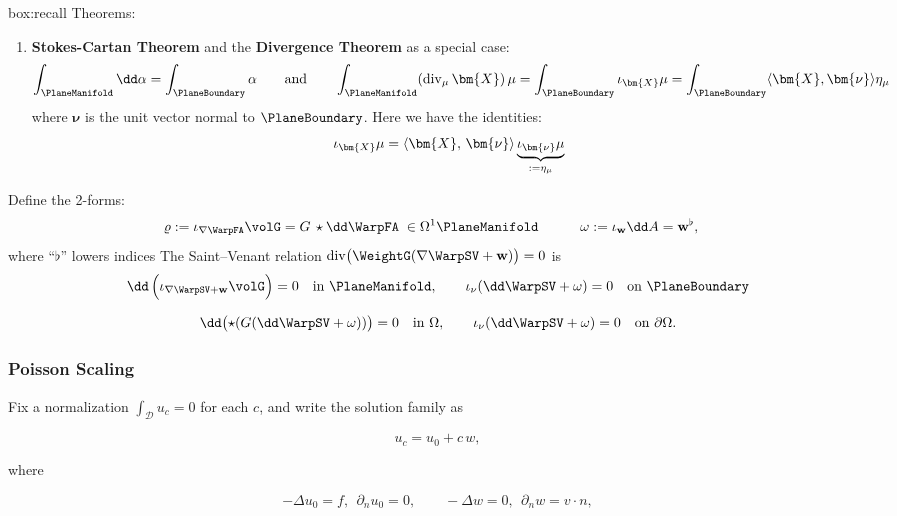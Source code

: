 \begin{ambox}{box:recall}
Theorems:
\begin{enumerate}
\item \textbf{Stokes-Cartan Theorem}
and the \textbf{Divergence Theorem} as a special case:
\begin{equation}
\int_{\PlaneManifold} \dd \alpha = \int_{\PlaneBoundary} \alpha
\qquad\text{and}\qquad
\int_{\PlaneManifold} (\operatorname{div}_{\mu} \bm{X}) \, \mu = \int_{\PlaneBoundary} \interior{\bm{X}}{\mu}
= \int_{\PlaneBoundary}\langle \bm{X}, \bm{\nu}\rangle \eta_{\mu}
\label{eq:gauss-div-thm}
\end{equation}
where $\bm{\nu}$ is the unit vector normal to $\PlaneBoundary$. 
Here we have the identities:
$$
\interior{\bm{X}}{\mu} = \langle \bm{X},\, \bm{\nu}\rangle \underbrace{\interior{\bm{\nu}}{\mu}}_{:= \eta_{\mu}}
$$
\end{enumerate}
\end{ambox}


Define the 2-forms:
\[
\begin{aligned}
    \varrho &:= \interior{\nabla\WarpFA}{\volG}
            = G\,\starE \dd\WarpFA \;\in\Omega^{1}\PlaneManifold
    &\qquad
    \omega &:= \ii_{\qvec}\dd A
            = \qvec^{\flat},
\end{aligned}
\]
where ``\(\flat\)'' lowers indices \citep{abraham1988manifolds}
The Saint–Venant relation
\(
   \operatorname{div}\bigl(\WeightG(\nabla\WarpSV+\qvec)\bigr)=0
\)
is
\begin{equation}
   \dd \,\Bigl(\ii_{\nabla\WarpSV+\qvec}\volG\Bigr)=0
   \quad\text{in }\PlaneManifold,
   \qquad
   \ii_{\nu}(\dd\WarpSV+\omega)=0
   \quad\text{on }\PlaneBoundary
   \label{eq:warp-sv-bvp}
\end{equation}

\[
   \dd\bigl(\starE(G(\dd\WarpSV+\omega))\bigr)=0
   \quad\text{in }\Omega,
   \qquad
   \ii_{\nu}(\dd\WarpSV+\omega)=0
   \quad\text{on }\partial\Omega.
\]
%
%
%

\iffalse
\subsubsection{Poisson Scaling}
Fix a normalization $\int_{\mathscr D} u_c=0$ for each $c$, and write the solution family as

$$
u_c = u_0 + c\,w,
$$

where

$$
-\Delta u_0=f,\ \ \partial_n u_0=0,\qquad
-\Delta w=0,\ \ \partial_n w=v\!\cdot n,
$$

